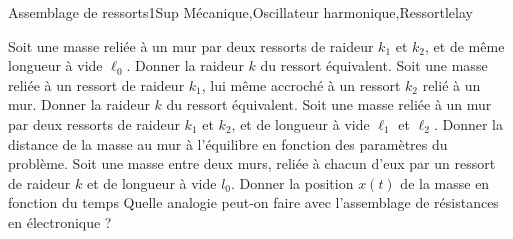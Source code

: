 
\begin{exercise}{Assemblage de ressorts}{1}{Sup}
{Mécanique,Oscillateur harmonique,Ressort}{lelay}

\begin{questions}
    \question Soit une masse reliée à un mur par deux ressorts de raideur $k_1$ et $k_2$, et de même longueur à vide $\ell_0$. Donner la raideur $k$ du ressort équivalent.
    \question Soit une masse reliée à un ressort de raideur $k_1$, lui même accroché à un ressort $k_2$ relié à un mur. Donner la raideur $k$ du ressort équivalent.
    \question Soit une masse reliée à un mur par deux ressorts de raideur $k_1$ et $k_2$, et de longueur à vide $\ell_1$ et $\ell_2$. Donner la distance de la masse au mur à l'équilibre en fonction des paramètres du problème.
    \question Soit une masse entre deux murs, reliée à chacun d'eux par un ressort de raideur $k$ et de longueur à vide $l_0$. Donner la position $x(t)$ de la masse en fonction du temps
    \questionbonus Quelle analogie peut-on faire avec l'assemblage de résistances en électronique ?
\end{questions}
\end{exercise}
